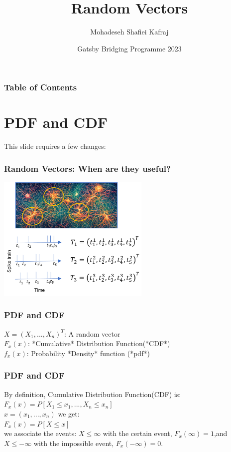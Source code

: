 \documentclass{beamer}
\title[Random Vectors ]
{Random Vectors\newline }
\subtitle{}
\author[Mohadeseh Shafiei Kafraj] %
{Mohadeseh Shafiei Kafraj\inst{1}}
\institute[UCL] %
{
  \inst{1}%
  Gatsby Computational Neuroscience Unit\\
  University College London
}
\date[Gatsby Bridging Programme  2023] %
{Gatsby Bridging Programme 2023}
\begin{document}
\frame{\titlepage}

\begin{frame}
\frametitle{Table of Contents}
\tableofcontents
\end{frame}


\section{PDF and CDF}
\begin{frame}
This slide requires a few changes:
\frametitle{Random Vectors: When are they useful?}
\center \includegraphics[height=6cm]{Random_Vector_Example.png}
\end{frame}

\begin{frame}
\frametitle{PDF and CDF}
$X = (X_1, ..., X_n)^T$: A random vector\newline \\
$F_x(x)$: *Cumulative* Distribution Function(*CDF*)\newline\\
$f_x(x)$: Probability *Density* function (*pdf*)\newline\\
\end{frame}

\begin{frame}
\frametitle{PDF and CDF}
By definition, Cumulative Distribution Function(CDF) is:\newline
$F_x(x) = P[X_1 \le x_1, ..., X_n\le x_n]$\newline\\
$x = (x_1, ..., x_n)$ we get:\newline\\
$F_x(x) = P[X\le x]$\newline\\
we associate the events:\newline
${X \le \infty}$ with the certain event, $F_x(\infty) = 1$,and\newline\\
${X \le -\infty}$ with the impossible event, $F_x(-\infty) = 0.$\\
\end{frame}
\end{document}
